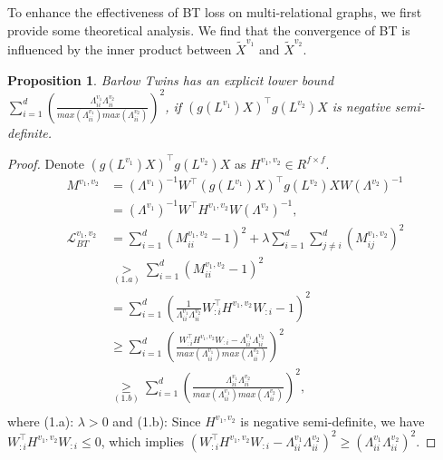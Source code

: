 \documentclass[letterpaper]{article} %
\newtheorem{proposition}{Proposition}
\begin{document}
To enhance the effectiveness of BT loss on
multi-relational graphs, we first provide some theoretical analysis. We find that the convergence of BT is influenced by the inner product between $\widetilde{X}^{v_1}$ and $\widetilde{X}^{v_2}$.


\begin{proposition}\label{proposition1} 
Barlow Twins has an explicit lower bound $\sum_{i=1}^d (\frac{\Lambda^{v_1}_{ii} \Lambda^{v_2}_{ii}}{max(\Lambda^{v_1}_{ii}) max(\Lambda^{v_2}_{ii})})^2$, if $(g(L^{v_{1}})X)^{\top} g(L^{v_{2}}) X$ is negative semi-definite. 
\end{proposition}



\begin{proof}
Denote $(g(L^{v_1})X)^{\top} g(L^{v_2}) X $ as $H^{v_1, v_2} \in R^{f \times f}.$ 
\begin{equation}\label{proof1}
\begin{aligned}
    M^{v_1, v_2}
    &= (\Lambda^{v_1})^{-1} {W}^{\top} (g(L^{v_1})X)^{\top} g(L^{v_2}) X W (\Lambda^{v_2})^{-1} \\
    &= (\Lambda^{v_1})^{-1}{W}^{\top} H^{v_1, v_2} W (\Lambda^{v_2})^{-1},
    \\ 
    \mathcal{L}^{v_1,v_2}_{BT} 
    &=\sum_{i=1}^{d}\left(M^{v_1,v_2}_{i i}-1\right)^{2}+\lambda \sum_{i=1}^{d} \sum_{j \neq i}^d (M^{v_1,v_2}_{i j})^{2}\\
    & \underset{(1.a)}{>} \sum_{i=1}^{d}\left(M^{v_1, v_2}_{i i}-1\right)^{2}\\
    &= \sum_{i=1}^{d} (\frac{1}{\Lambda^{v_1}_{ii} \Lambda^{v_2}_{ii}} {W}_{:i}^{\top} H^{v_1, v_2} {W}_{:i}-1)^{2}\\
    & \geq \sum_{i=1}^{d} (\frac{{W}_{:i}^{\top} H^{v_1, v_2} {W}_{:i}-\Lambda^{v_1}_{ii} \Lambda^{v_2}_{ii}}{max(\Lambda^{v_1}_{ii}) max(\Lambda^{v_2}_{ii})})^{2}\\
    & \underset{(1.b)}{\geq} \sum_{i=1}^{d} (\frac{\Lambda^{v_1}_{ii} \Lambda^{v_2}_{ii}}{max(\Lambda^{v_1}_{ii}) max(\Lambda^{v_2}_{ii})})^{2},\\
\end{aligned}
\end{equation}
where (1.a): $\lambda > 0$ and 
(1.b): Since $H^{v_1, v_2}$ is negative semi-definite, we have 
${W}_{:i}^{\top} H^{v_1, v_2} {W}_{:i} \leq 0$, which implies $({W}_{:i}^{\top} H^{v_1, v_2} {W}_{:i}-\Lambda^{v_1}_{ii} \Lambda^{v_2}_{ii})^{2} \geq (\Lambda^{v_1}_{ii} \Lambda^{v_2}_{ii})^{2}.$
\end{proof}
\end{document}
